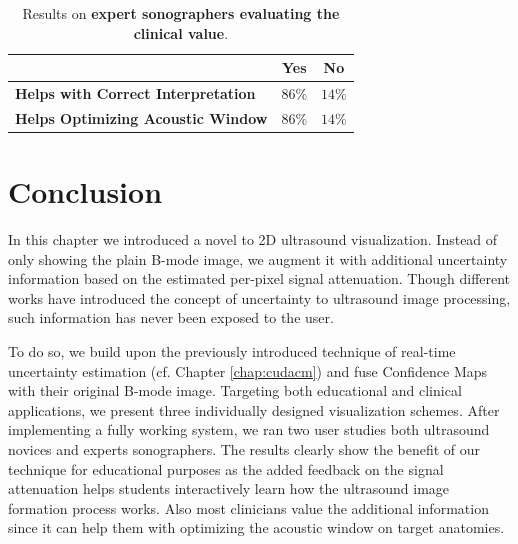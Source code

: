 \begin{table}[th]
	\centering
	\begin{tabu} to 0.9
		\toprule
		\quad                             & \bfseries Yes & \bfseries No \\
		\midrule
		Helps with Correct Interpretation & ${86\%}$      & $14\%$       \\
		Helps Optimizing Acoustic Window  & ${86\%}$      & $14\%$       \\
		\bottomrule
	\end{tabu}
	\caption{Results on \textbf{expert sonographers evaluating the clinical value}.}
	\label{tbl:cmvis:results}
\end{table}


\section{Conclusion}
\label{sec:cmvis:conclusion}
In this chapter we introduced a novel  to 2D ultrasound visualization.
Instead of only showing the plain B-mode image, we augment it with additional uncertainty information based on the estimated per-pixel signal attenuation.
Though different works have introduced the concept of uncertainty to ultrasound image processing, such information has never been exposed to the user.

To do so, we build upon the previously introduced technique of real-time uncertainty estimation (cf. Chapter \ref{chap:cudacm}) and fuse Confidence Maps with their original B-mode image.
Targeting both educational and clinical applications, we present three individually designed visualization schemes.
After implementing a fully working system, we ran two user studies  both ultrasound novices and experts sonographers.
The results clearly show the benefit of our technique for educational purposes as the added feedback on the signal attenuation helps students interactively learn how the ultrasound image formation process works.
Also most clinicians value the additional information since it can help them with optimizing the acoustic window on target anatomies.
